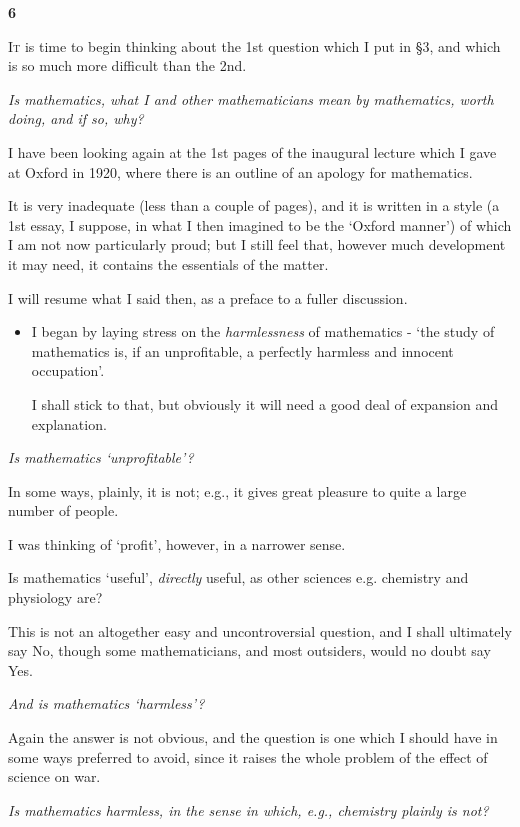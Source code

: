 \documentclass{article}
\numberwithin{equation}{section}
\begin{document}
\begin{center}
    \large\textbf{6}
\end{center}
\textsc{It} is time to begin thinking about the 1st question which I put in \S3, and which is so much more difficult than the 2nd.

\textit{Is mathematics, what I and other mathematicians mean by mathematics, worth doing, and if so, why?}

%
I have been looking again at the 1st pages of the inaugural lecture which I gave at Oxford in 1920, where there is an outline of an apology for mathematics.

It is very inadequate (less than a couple of pages), and it is written in a style (a 1st essay, I suppose, in what I then imagined to be the `Oxford manner') of which I am not now particularly proud; but I still feel that, however much development it may need, it contains the essentials of the matter.

I will resume what I said then, as a preface to a fuller discussion.
\begin{itemize}
    \item[(1)] I began by laying stress on the \textit{harmlessness} of mathematics - `the study of mathematics is, if an unprofitable, a perfectly harmless and innocent occupation'.
    
    I shall stick to that, but obviously it will need a good deal of expansion and explanation.
\end{itemize}
\textit{\emph{Is} mathematics `unprofitable'?}

In some ways, plainly, it is not; e.g., it gives great pleasure to quite a large number of people.

I was thinking of `profit', however, in a narrower sense.

Is mathematics `useful', \textit{directly} useful, as other sciences e.g. chemistry and physiology are?

This is not an altogether easy and uncontroversial question, and I shall ultimately say No, though some mathematicians, and most outsiders, would no doubt say Yes.

\textit{And is mathematics `harmless'?}

Again the answer is not obvious, and the question is one which I should have in some ways preferred to avoid, since it raises the whole problem of the effect of science on war.

\textit{Is mathematics harmless, in the sense in which, e.g., chemistry plainly is not?}
\end{document}
